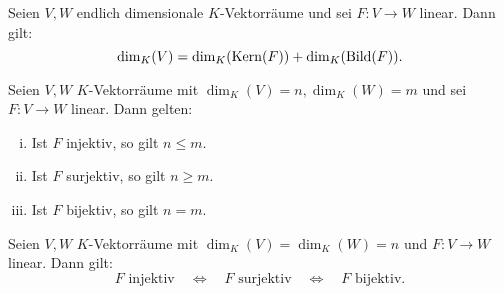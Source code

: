 \setcounter{satz}{14}
\begin{satz}
	\label{satz:I.10.15}
	Seien $V,W$ endlich dimensionale $K$-Vektorräume und sei $F \colon V \rightarrow W$ linear. 
	Dann gilt:
	\[
		\dim_K(V) = \dim_K(\operatorname{Kern}(F)) + \dim_K(\operatorname{Bild}(F)).
	\]
\end{satz}
\newpage
\begin{korollar}
	\label{kor:I.10.16}
	Seien $V,W$ $K$-Vektorräume mit $\dim_K(V) = n, \dim_K(W) = m$ und sei $F\colon V \rightarrow W$ linear.
	Dann gelten:
	\begin{enumerate}[(i)]
		\item Ist $F$ injektiv, so gilt $n \leq m$.
		\item Ist $F$ surjektiv, so gilt $n \geq m$.
		\item Ist $F$ bijektiv, so gilt $n = m$.
	\end{enumerate}
\end{korollar}

\begin{korollar}
	\label{kor:I.10.17}
	Seien $V,W$ $K$-Vektorräume mit $\dim_K(V) = \dim_K(W) = n$ und $F \colon V \rightarrow W$ linear.
	Dann gilt:
	\[
		F \text{ injektiv} \quad \Leftrightarrow \quad F \text{ surjektiv} \quad \Leftrightarrow \quad F \text{ bijektiv}.
	\]
\end{korollar}
\newpage